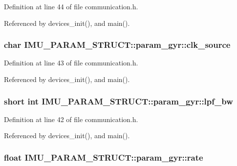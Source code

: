 Definition at line 44 of file communication.\-h.



Referenced by devices\-\_\-init(), and main().

\hypertarget{structIMU__PARAM__STRUCT_1_1param__gyr_aca3b791cb480f2da4703d4c256a7de48}{
\subsubsection[{clk\-\_\-source}]{\setlength{\rightskip}{0pt plus 5cm}char I\-M\-U\-\_\-\-P\-A\-R\-A\-M\-\_\-\-S\-T\-R\-U\-C\-T\-::param\-\_\-gyr\-::clk\-\_\-source}}\label{structIMU__PARAM__STRUCT_1_1param__gyr_aca3b791cb480f2da4703d4c256a7de48}


Definition at line 43 of file communication.\-h.



Referenced by devices\-\_\-init(), and main().

\hypertarget{structIMU__PARAM__STRUCT_1_1param__gyr_aa612f7299b43a1bf1fc597688c2fa02d}{
\subsubsection[{lpf\-\_\-bw}]{\setlength{\rightskip}{0pt plus 5cm}short int I\-M\-U\-\_\-\-P\-A\-R\-A\-M\-\_\-\-S\-T\-R\-U\-C\-T\-::param\-\_\-gyr\-::lpf\-\_\-bw}}\label{structIMU__PARAM__STRUCT_1_1param__gyr_aa612f7299b43a1bf1fc597688c2fa02d}


Definition at line 42 of file communication.\-h.



Referenced by devices\-\_\-init(), and main().

\hypertarget{structIMU__PARAM__STRUCT_1_1param__gyr_a5aa70e1e9634411c89aacfbc570cc91c}{
\subsubsection[{rate}]{\setlength{\rightskip}{0pt plus 5cm}float I\-M\-U\-\_\-\-P\-A\-R\-A\-M\-\_\-\-S\-T\-R\-U\-C\-T\-::param\-\_\-gyr\-::rate}}\label{structIMU__PARAM__STRUCT_1_1param__gyr_a5aa70e1e9634411c89aacfbc570cc91c}


